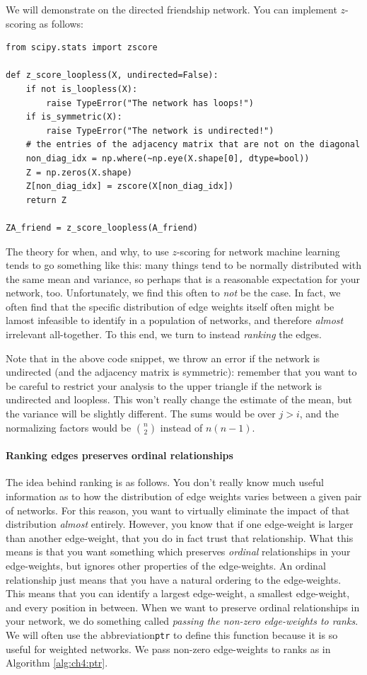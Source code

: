 We will demonstrate on the directed friendship network. You can implement $z$-scoring as follows:

\begin{lstlisting}[style=python]
from scipy.stats import zscore

def z_score_loopless(X, undirected=False):
    if not is_loopless(X):
        raise TypeError("The network has loops!")
    if is_symmetric(X):
        raise TypeError("The network is undirected!")
    # the entries of the adjacency matrix that are not on the diagonal
    non_diag_idx = np.where(~np.eye(X.shape[0], dtype=bool))
    Z = np.zeros(X.shape)
    Z[non_diag_idx] = zscore(X[non_diag_idx])
    return Z

ZA_friend = z_score_loopless(A_friend)
\end{lstlisting}

The theory for when, and why, to use $z$-scoring for network machine learning tends to go something like this: many things tend to be normally distributed with the same mean and variance, so perhaps that is a reasonable expectation for your network, too. Unfortunately, we find this often to \emph{not} be the case. In fact, we often find that the specific distribution of edge weights itself often might be lamost infeasible to identify in a population of networks, and therefore \emph{almost} irrelevant all-together. To this end, we turn to instead \emph{ranking} the edges.

Note that in the above code snippet, we throw an error if the network is undirected (and the adjacency matrix is symmetric): remember that you want to be careful to restrict your analysis to the upper triangle if the network is undirected and loopless. This won't really change the estimate of the mean, but the variance will be slightly different. The sums would be over $j > i$, and the normalizing factors would be $\binom n 2$ instead of $n(n - 1)$.

\paragraph{Ranking edges preserves ordinal relationships}

The idea behind ranking is as follows. You don't really know much useful information as to how the distribution of edge weights varies between a given pair of networks. For this reason, you want to virtually eliminate the impact of that distribution \emph{almost} entirely. However, you know that if one edge-weight is larger than another edge-weight, that you do in fact trust that relationship. What this means is that you want something which preserves \emph{ordinal} relationships in your edge-weights, but ignores other properties of the edge-weights. An ordinal relationship just means that you have a natural ordering to the edge-weights. This means that you can identify a largest edge-weight, a smallest edge-weight, and every position in between. When we want to preserve ordinal relationships in your network, we do something called \emph{passing the non-zero edge-weights to ranks}. We will often use the abbreviation\texttt{ptr} to define this function because it is so useful for weighted networks. We pass non-zero edge-weights to ranks as in Algorithm \ref{alg:ch4:ptr}.

